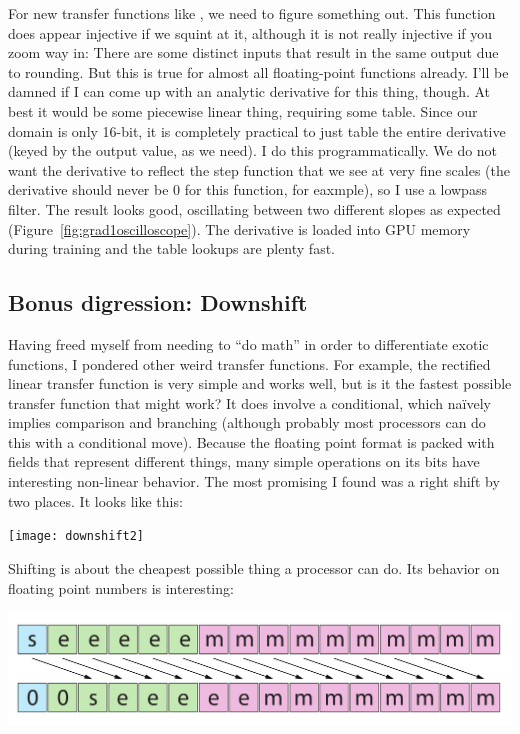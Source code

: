\documentclass[twocolumn]{article}
\begin{document}
For new transfer functions like \gradone, we need to figure something
out. This function does appear injective if we squint at it, although
it is not really injective if you zoom way in: There are
some distinct inputs that result in the same output due to rounding.
But this is true for almost all floating-point functions already.
I'll be damned if I can come up with an analytic derivative for this
thing, though. At best it would be some piecewise linear thing, requiring
some table. Since our domain is only 16-bit, it is completely practical
to just table the entire derivative (keyed by the output value, as we need).
I do this programmatically. We do not want the derivative to reflect
the step function that we see at very fine scales (the derivative should
never be 0 for this function, for eaxmple), so I use a lowpass
filter. The result looks good, oscillating between two different slopes
as expected (Figure~\ref{fig:grad1oscilloscope}). The derivative
is loaded into GPU memory during training and the table lookups are
plenty fast.

\subsection{Bonus digression: Downshift}
Having freed myself from needing to ``do math'' in order to
differentiate exotic functions, I pondered other weird transfer
functions. For example, the rectified linear transfer function is very
simple and works well, but is it the fastest possible transfer
function that might work? It does involve a conditional, which na\"ively
implies comparison and branching (although probably most processors
can do this with a conditional move). Because the floating point
format is packed with fields that represent different things, many
simple operations on its bits have interesting non-linear behavior.
The most promising I found was a right shift by two places. It looks
like this:

\begin{center}
\texttt{[image: downshift2]}
\end{center}


Shifting is about the cheapest possible thing a processor can do. Its
behavior on floating point numbers is interesting:

\includegraphics[width=0.9 \linewidth]{downshiftbits}
\end{document}

